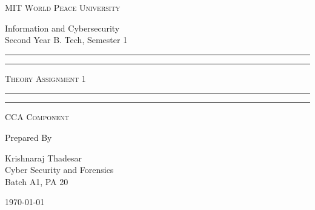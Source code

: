 \documentclass[11pt]{article}
\begin{document}
\begin{titlepage}
    \centering


    \huge\textsc{
        MIT World Peace University
    }\\

    \vspace{0.75\baselineskip} %

    \LARGE{
        Information and Cybersecurity\\
        Second Year B. Tech, Semester 1
    }

    \vfill %


    \rule{\textwidth}{1.6pt}\vspace*{-\baselineskip}\vspace*{2pt}
    \rule{\textwidth}{0.6pt}
    \vspace{0.75\baselineskip} %



    \huge{\textsc{
            Theory Assignment 1
        }} \\



    \vspace{0.5\baselineskip} %
    \rule{\textwidth}{0.6pt}\vspace*{-\baselineskip}\vspace*{2.8pt}
    \rule{\textwidth}{1.6pt}

    \vspace{1\baselineskip} %


    \LARGE\textsc{
        CCA Component
    } %
    \vfill


    Prepared By
    \vspace{0.5\baselineskip} %

    \Large{
        Krishnaraj Thadesar \\
        Cyber Security and Forensics\\
        Batch A1, PA 20
    }


    \vspace{0.5\baselineskip} %
    \today

\end{titlepage}
\end{document}
